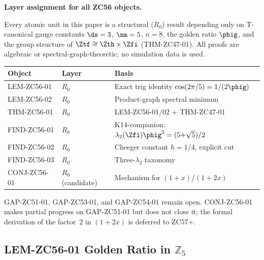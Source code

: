\documentclass[12pt, a4paper]{article}
\begin{document}
\begin{layerbox}
\textbf{Layer assignment for all ZC56 objects.}

Every atomic unit in this paper is a structural ($R_0$) result
depending only on T-canonical gauge constants $\ds=3$, $\nm=5$,
$n=8$, the golden ratio $\phig$, and the group structure of
$\Ztf\cong\Zth\times\Zfi$ (THM-ZC47-01).  All proofs are
algebraic or spectral-graph-theoretic; no simulation data is used.

\begin{center}
\begin{tabular}{@{}lll@{}}
\toprule
\textbf{Object} & \textbf{Layer} & \textbf{Basis} \\
\midrule
LEM-ZC56-01 & $R_0$ & Exact trig identity $\cos(2\pi/5)=1/(2\phig)$ \\
LEM-ZC56-02 & $R_0$ & Product-graph spectral minimum \\
THM-ZC56-01 & $R_0$ & LEM-ZC56-01/02 + THM-ZC47-01 \\
FIND-ZC56-01 & $R_0$ & K14-companion: $\lambda_2(\Zfi)\phig^2=(5{+}\sqrt{5})/2$ \\
FIND-ZC56-02 & $R_0$ & Cheeger constant $h=1/4$, explicit cut \\
FIND-ZC56-03 & $R_0$ & Three-$\lambda_2$ taxonomy \\
CONJ-ZC56-01 & $R_0$ (candidate) & Mechanism for $(1{+}x)/(1{+}2x)$ \\
\bottomrule
\end{tabular}
\end{center}

GAP-ZC51-01, GAP-ZC53-01, and GAP-ZC54-01 remain open.
CONJ-ZC56-01 makes partial progress on GAP-ZC51-01 but does not
close it; the formal derivation of the factor~$2$ in $(1+2x)$
is deferred to ZC57+.
\end{layerbox}

\subsection{LEM-ZC56-01 \quad Golden Ratio in $\mathbb{Z}_5$}
\label{sec:lem01}

\end{document}
